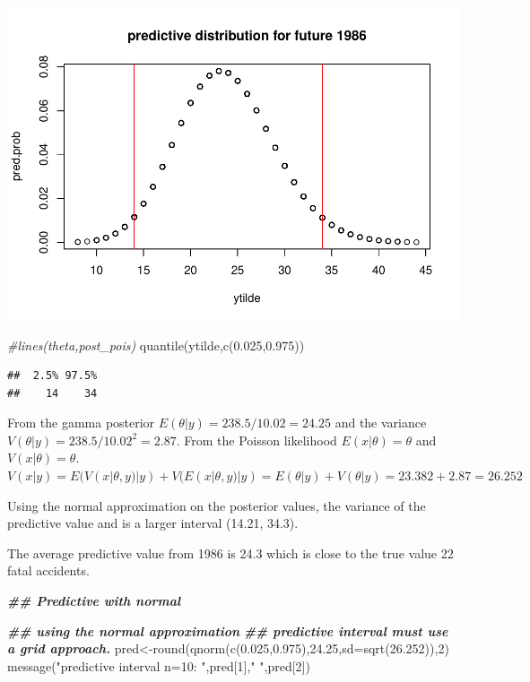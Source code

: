 \documentclass[
]{book}
\newenvironment{Shaded}{\begin{snugshade}}{\end{snugshade}}
\newcommand{\AttributeTok}[1]{\textcolor[rgb]{0.77,0.63,0.00}{#1}}
\newcommand{\CommentTok}[1]{\textcolor[rgb]{0.56,0.35,0.01}{\textit{#1}}}
\newcommand{\DecValTok}[1]{\textcolor[rgb]{0.00,0.00,0.81}{#1}}
\newcommand{\DocumentationTok}[1]{\textcolor[rgb]{0.56,0.35,0.01}{\textbf{\textit{#1}}}}
\newcommand{\FloatTok}[1]{\textcolor[rgb]{0.00,0.00,0.81}{#1}}
\newcommand{\FunctionTok}[1]{\textcolor[rgb]{0.00,0.00,0.00}{#1}}
\newcommand{\NormalTok}[1]{#1}
\newcommand{\OtherTok}[1]{\textcolor[rgb]{0.56,0.35,0.01}{#1}}
\newcommand{\StringTok}[1]{\textcolor[rgb]{0.31,0.60,0.02}{#1}}
\theoremstyle{definition}
\theoremstyle{definition}
\theoremstyle{definition}
\theoremstyle{definition}
\theoremstyle{remark}
\begin{document}
\includegraphics{_main_files/figure-latex/unnamed-chunk-23-2.pdf}

\begin{Shaded}
\begin{Highlighting}[]
 \CommentTok{\#lines(theta,post\_pois)}
 \FunctionTok{quantile}\NormalTok{(ytilde,}\FunctionTok{c}\NormalTok{(}\FloatTok{0.025}\NormalTok{,}\FloatTok{0.975}\NormalTok{))}
\end{Highlighting}
\end{Shaded}

\begin{verbatim}
##  2.5% 97.5% 
##    14    34
\end{verbatim}

From the gamma posterior \(E(\theta | y) = 238.5/10.02=24.25\) and the variance \(V(\theta|y)= 238.5/10.02^2=2.87\). From the Poisson likelihood \(E(x|\theta)=\theta\) and \(V(x|\theta)=\theta\). \(V(x|y)= E(V(x|\theta,y) | y) + V(E(x|\theta,y)|y)= E(\theta| y)+ V(\theta|y) = 23.382+2.87= 26.252\)

Using the normal approximation on the posterior values, the variance of the predictive value and is a larger interval (14.21, 34.3).

The average predictive value from 1986 is 24.3 which is close to the true value 22 fatal accidents.

\begin{Shaded}
\begin{Highlighting}[]
  \DocumentationTok{\#\# Predictive with normal}

\DocumentationTok{\#\# using the normal approximation}
\DocumentationTok{\#\# predictive interval must use a grid approach.}
\NormalTok{     pred}\OtherTok{\textless{}{-}}\FunctionTok{round}\NormalTok{(}\FunctionTok{qnorm}\NormalTok{(}\FunctionTok{c}\NormalTok{(}\FloatTok{0.025}\NormalTok{,}\FloatTok{0.975}\NormalTok{),}\FloatTok{24.25}\NormalTok{,}\AttributeTok{sd=}\FunctionTok{sqrt}\NormalTok{(}\FloatTok{26.252}\NormalTok{)),}\DecValTok{2}\NormalTok{)}
  \FunctionTok{message}\NormalTok{(}\StringTok{"predictive interval n=10: "}\NormalTok{,pred[}\DecValTok{1}\NormalTok{],}\StringTok{" "}\NormalTok{,pred[}\DecValTok{2}\NormalTok{])}
\end{Highlighting}
\end{Shaded}
\end{document}
